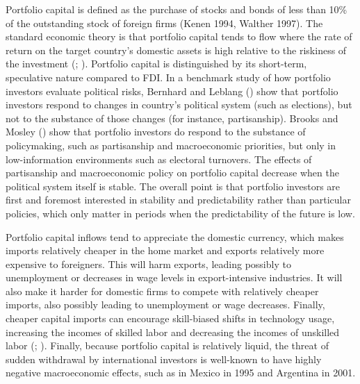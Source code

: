 \documentclass[12pt]{report}
\begin{document}
Portfolio capital is defined as the purchase of stocks and bonds of less than 10\% of the
outstanding stock of foreign firms (Kenen 1994, Walther 1997). The standard economic theory is that
portfolio capital tends to flow where the rate of return on the target country's domestic assets is
high relative to the riskiness of the investment (\citealt[743]{mosley2003global};
\citealt[685]{ISQU:ISQU420}). Portfolio capital is distinguished by its short-term, speculative
nature compared to FDI. In a benchmark study of how portfolio investors evaluate political risks,
Bernhard and Leblang (\citeyear{Bernhard:2002gy}) show that portfolio investors respond to changes
in country's political system (such as elections), but not to the substance of those changes (for
instance, partisanship). Brooks and Mosley (\citeyear{Brooks:2007we}) show that portfolio investors
do respond to the substance of policymaking, such as partisanship and macroeconomic priorities, but
only in low-information environments such as electoral turnovers. The effects of partisanship and
macroeconomic policy on portfolio capital decrease when the political system itself is stable. The
overall point is that portfolio investors are first and foremost interested in stability and
predictability rather than particular policies, which only matter in periods when the predictability
of the future is low.

Portfolio capital inflows tend to appreciate the domestic currency, which makes imports relatively
cheaper in the home market and exports relatively more expensive to foreigners. This will harm
exports, leading possibly to unemployment or decreases in wage levels in export-intensive
industries. It will also make it harder for domestic firms to compete with relatively cheaper
imports, also possibly leading to unemployment or wage decreases. Finally, cheaper capital imports
can encourage skill-biased shifts in technology usage, increasing the incomes of skilled labor and
decreasing the incomes of unskilled labor (\citealt{Cragg:1996iy}; \citealt{Ros:2000vy}). Finally,
because portfolio capital is relatively liquid, the threat of sudden withdrawal by international
investors is well-known to have highly negative macroeconomic effects, such as in Mexico in 1995 and
Argentina in 2001.
\end{document}
